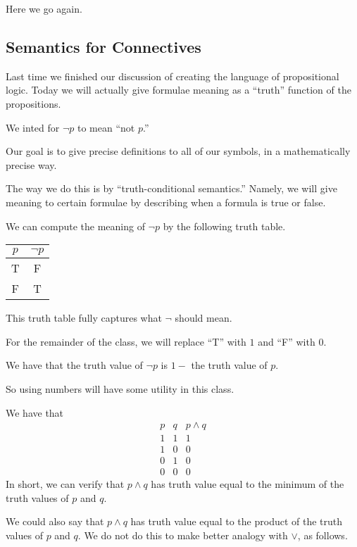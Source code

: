 
Here we go again.

\subsection{Semantics for Connectives}
Last time we finished our discussion of creating the language of propositional logic. Today we will actually give formulae meaning as a ``truth'' function of the propositions.
\begin{example}
	We inted for $\lnot p$ to mean ``not $p$.''
\end{example}
Our goal is to give precise definitions to all of our symbols, in a mathematically precise way.

The way we do this is by ``truth-conditional semantics.'' Namely, we will give meaning to certain formulae by describing when a formula is true or false.
\begin{example}
	We can compute the meaning of $\lnot p$ by the following truth table.
	\begin{center}
		\begin{tabular}{c|c}
			$p$ & $\lnot p$ \\\hline
			T & F \\
			F & T
		\end{tabular}
	\end{center}
	This truth table fully captures what $\lnot$ should mean.
\end{example}
\begin{convention}
	For the remainder of the class, we will replace ``T'' with $1$ and ``F'' with $0$.
\end{convention}
\begin{example}
	We have that the truth value of $\lnot p$ is $1-$ the truth value of $p$.
\end{example}
So using numbers will have some utility in this class.
\begin{example}
	We have that
	\[\begin{array}{c|c||c}
		p & q & p\land q \\\hline
		1 & 1 & 1 \\
		1 & 0 & 0 \\
		0 & 1 & 0 \\
		0 & 0 & 0
	\end{array}\]
	In short, we can verify that $p\land q$ has truth value equal to the minimum of the truth values of $p$ and $q$.
\end{example}
We could also say that $p\land q$ has truth value equal to the product of the truth values of $p$ and $q$. We do not do this to make better analogy with $\lor$, as follows.
